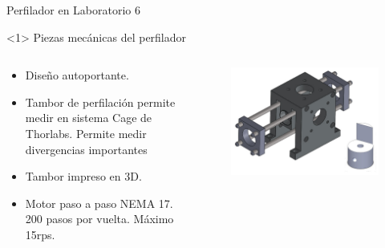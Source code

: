 \begin{frame}{Perfilador en Laboratorio 6}
    \begin{onlyenv}<1>
        Piezas mecánicas del perfilador
        \begin{columns}[c]
            \begin{column}{.5\textwidth}
                \begin{itemize}
                \item Diseño autoportante.
                \item Tambor de perfilación permite medir en sistema Cage de Thorlabs. Permite medir divergencias importantes
                \item Tambor impreso en 3D.
                \item Motor paso a paso NEMA 17. 200 pasos por vuelta. Máximo 15rps. 
                \end{itemize}
            \end{column}
            \begin{column}{0.5\textwidth}
                \begin{figure}
                \centering
                \includegraphics[width=\textwidth]{fig/perfilador/soporte_labo6}
                \label{fig:pieza}
                \end{figure}
            \end{column}
        \end{columns}
    \end{onlyenv}


\end{frame}
